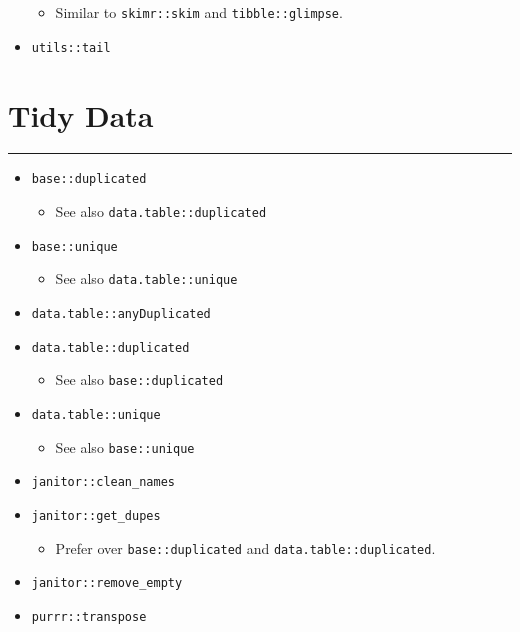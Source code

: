 \documentclass[
]{book}
\providecommand{\tightlist}{%
  \setlength{\itemsep}{0pt}\setlength{\parskip}{0pt}}
\begin{document}
\begin{itemize}
  \begin{itemize}
  \tightlist
  \item
    Similar to \texttt{skimr::skim} and \texttt{tibble::glimpse}.
  \end{itemize}
\item
  \texttt{utils::tail}
\end{itemize}

\hypertarget{tidy-data}{%
\section{Tidy Data}\label{tidy-data}}

\begin{center}\rule{0.5\linewidth}{0.5pt}\end{center}

\begin{itemize}
\tightlist
\item
  \texttt{base::duplicated}

  \begin{itemize}
  \tightlist
  \item
    See also \texttt{data.table::duplicated}
  \end{itemize}
\item
  \texttt{base::unique}

  \begin{itemize}
  \tightlist
  \item
    See also \texttt{data.table::unique}
  \end{itemize}
\item
  \texttt{data.table::anyDuplicated}
\item
  \texttt{data.table::duplicated}

  \begin{itemize}
  \tightlist
  \item
    See also \texttt{base::duplicated}
  \end{itemize}
\item
  \texttt{data.table::unique}

  \begin{itemize}
  \tightlist
  \item
    See also \texttt{base::unique}
  \end{itemize}
\item
  \texttt{janitor::clean\_names}
\item
  \texttt{janitor::get\_dupes}

  \begin{itemize}
  \tightlist
  \item
    Prefer over \texttt{base::duplicated} and \texttt{data.table::duplicated}.
  \end{itemize}
\item
  \texttt{janitor::remove\_empty}
\item
  \texttt{purrr::transpose}


\end{itemize}
\end{document}
